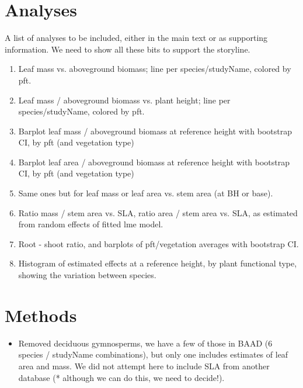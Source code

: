 \documentclass[a4paper]{article}
\begin{document}
\section{Analyses}

A list of analyses to be included, either in the main text or as supporting information. We need to show all these bits to support the storyline.

\begin{enumerate}
  \item Leaf mass vs. aboveground biomass; line per species/studyName, colored by pft.
  \item Leaf mass / aboveground biomass vs. plant height; line per species/studyName, colored by pft.
  \item Barplot leaf mass / aboveground biomass at reference height with bootstrap CI, by pft (and vegetation type)
  \item Barplot leaf area / aboveground biomass at reference height with bootstrap CI, by pft (and vegetation type)
  \item Same ones but for leaf mass or leaf area vs. stem area (at BH or base).
  \item Ratio mass / stem area vs. SLA, ratio area / stem area vs. SLA, as estimated from random effects of fitted lme model.
  \item Root - shoot ratio, and barplots of pft/vegetation averages with bootstrap CI.
  \item Histogram of estimated effects at a reference height, by plant functional type, showing the variation between species. 
\end{enumerate}







\section{Methods}

\begin{itemize}
  \item Removed deciduous gymnosperms, we have a few of those in BAAD (6 species / studyName combinations), but only one includes estimates of leaf area and mass. We did not attempt here to include SLA from another database (* although we can do this, we need to decide!).
\end{itemize}
\end{document}
